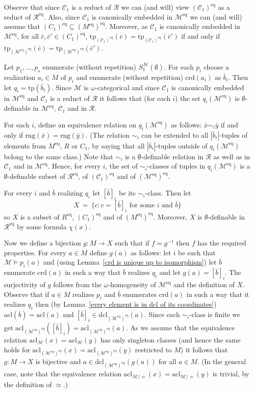 \documentclass[11pt, twoside]{amsart}
\numberwithin{equation}{section}
\newcommand{\tp}{\mathrm{tp}}
\newcommand{\acl}{\mathrm{acl}}
\newcommand{\dcl}{\mathrm{dcl}}
\newcommand{\es}{\emptyset}
\newcommand{\crd}{\mathrm{crd}}
\newcommand{\meq}{^{\mathrm{eq}}}
\newcommand{\mcC}{\mathcal{C}}
\newcommand{\mcM}{\mathcal{M}}
\newcommand{\mcR}{\mathcal{R}}
\newcommand{\rng}{\mathrm{rng}}
\begin{document}
Observe that since $\mcC_1$ is a reduct of $\mcR$ we can (and will) view $(\mcC_1)\meq$ as a reduct of $\mcR\meq$.
Also, since $\mcC_1$ is canonically embedded in $\mcM\meq$ we can (and will) assume that 
$(C_1)\meq \subseteq (M\meq)\meq$. 
Moreover, as $\mcC_1$ is canonically embedded in $\mcM\meq$,
for all $\bar{c}, \bar{c}' \in (C_1)\meq$, $\tp_{(\mcC_1)\meq}(\bar{c}) = \tp_{(\mcC_1)\meq}(\bar{c}')$
if and only if $\tp_{(\mcM\meq)\meq}(\bar{c}) = \tp_{(\mcM\meq)\meq}(\bar{c}')$.

Let $p_1, \ldots, p_s$ enumerate (without repetition) $S^\mcM_1(\es)$.
For each $p_i$ choose a realization $a_i \in M$ of $p_i$ and enumerate (without repetition) $\crd(a_i)$ as $\bar{b}_i$.
Then let $q_i = \tp(\bar{b}_i)$.
Since $\mcM$ is $\omega$-categorical and since $\mcC_1$ is canonically embedded in $\mcM\meq$ and
$\mcC_1$ is a reduct of $\mcR$ it follows that (for each $i$) the set $q_i(\mcM\meq)$ is $\es$-definable in $\mcM\meq$,
$\mcC_1$ and in $\mcR$.

For each $i$, define an equivalence relation on $q_i(\mcM\meq)$ as follows: 
$\bar{x} \sim_i \bar{y}$ if and only if $\rng(\bar{x}) = \rng(\bar{y})$.
(The relation $\sim_i$ can be extended to all $|\bar{b}_i|$-tuples of elements from $M\meq$, $R$ or $C_1$,
by saying that all $|\bar{b}_i|$-tuples outside of $q_i(\mcM\meq)$ belong to the same class.)
Note that $\sim_i$ is a $\es$-definable relation in $\mcR$ as well as in $\mcC_1$ and in $\mcM\meq$.
Hence, for every $i$, the set of $\sim_i$-classes of tuples in $q_i(\mcM\meq)$ is a $\es$-definable subset of $\mcR\meq$, of $(\mcC_1)\meq$ and of
$(\mcM\meq)\meq$.

For every $i$ and $\bar{b}$ realizing $q_i$ let $[\bar{b}]_i$ be its $\sim_i$-class.
Then let
\[X \ = \ \{ c : c = [\bar{b}]_i \text{ for some $i$ and $\bar{b}$} \} \]
so $X$ is a subset of $R\meq$, $(C_1)\meq$ and of $(M\meq)\meq$.
Moreover, $X$ is $\es$-definable in $\mcR\meq$ by some formula $\chi(x)$. 

Now we define a bijection $g : M \to X$ such that if $f = g^{-1}$ then $f$ has the required properties.
For every  $a \in M$ define $g(a)$ as follows: 
let $i$ be such that $\mcM \models p_i(a)$ and (using Lemma~\ref{crd is unique up to isomorphism})
let $\bar{b}$ enumerate $\crd(a)$ in such a way that
$\bar{b}$ realizes $q_i$ and let $g(a) = [\bar{b}]_i$.
The surjectivity of $g$ follows from the $\omega$-homogeneity of $\mcM\meq$ and the definition of $X$.
Observe that if $a \in M$ realizes $p_i$ and $\bar{b}$ enumerates $\crd(a)$ in such a way that it realizes $q_i$
then (by Lemma~\ref{every element is in dcl of its coordinates})
$\acl(\bar{b}) = \acl(a)$ and $[\bar{b}]_i \in \dcl_{(\mcM\meq)\meq}(a)$. 
Since each $\sim_i$-class is finite we get 
$\acl_{(\mcM\meq)\meq}([\bar{b}]_i) = \acl_{(\mcM\meq)\meq}(a)$.
As we assume that the equivalence relation $\acl_\mcM(x) = \acl_\mcM(y)$ has only singleton classes 
(and hence the same holds for $\acl_{(\mcM\meq)\meq}(x) = \acl_{(\mcM\meq)\meq}(y)$ restricted to $M$) it follows that 
$g : M \to X$ is bijective and $a \in \dcl_{(\mcM\meq)\meq}(g(a))$ for all $a \in M$. 
(In the general case, note that the equivalence relation $\acl_{\mcM / \approx}(x) = \acl_{\mcM / \approx}(y)$
is trivial, by the definition of $\approx$.)
\end{document}
